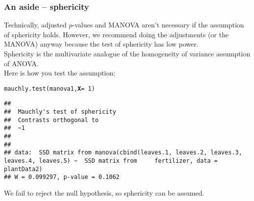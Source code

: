 \documentclass[color=usenames,dvipsnames]{beamer}\usepackage[]{graphicx}\usepackage[]{color}
\makeatletter
\newcommand{\hlnum}[1]{\textcolor[rgb]{0.69,0.494,0}{#1}}%
\newcommand{\hlopt}[1]{\textcolor[rgb]{0,0,0}{#1}}%
\newcommand{\hlstd}[1]{\textcolor[rgb]{0,0,0}{#1}}%
\newcommand{\hlkwc}[1]{\textcolor[rgb]{0,0,0}{\textbf{#1}}}%
\newcommand{\hlkwd}[1]{\textcolor[rgb]{0.004,0.004,0.506}{#1}}%
\newenvironment{kframe}{%
 \def\at@end@of@kframe{}%
 \ifinner\ifhmode%
  \def\at@end@of@kframe{\end{minipage}}%
  \begin{minipage}{\columnwidth}%
 \fi\fi%
 \def\FrameCommand##1{\hskip\@totalleftmargin \hskip-\fboxsep
 \colorbox{shadecolor}{##1}\hskip-\fboxsep
     \hskip-\linewidth \hskip-\@totalleftmargin \hskip\columnwidth}%
 \MakeFramed {\advance\hsize-\width
   \@totalleftmargin\z@ \linewidth\hsize
   \@setminipage}}%
 {\par\unskip\endMakeFramed%
 \at@end@of@kframe}
\newenvironment{knitrout}{}{} %
\makeatother
\begin{document}
\begin{frame}[fragile]
  \frametitle{An aside -- sphericity}
  \small
  {Technically, adjusted $p$-values and MANOVA aren't necessary if the
    assumption of sphericity holds. \alert{However}, we recommend
    doing the adjustments (or the MANOVA) anyway because the test of
    sphericity has low power. \\}
  \pause
  \vfill
  Sphericity is the multivariate analogue of the homogeneity of
  variance assumption of ANOVA. \\
  \pause
  \vfill
  Here is how you test the assumption: \\
  \footnotesize
\begin{knitrout}\scriptsize
{}\color{fgcolor}\begin{kframe}
\begin{alltt}
\hlkwd{mauchly.test}\hlstd{(manova1,} \hlkwc{X}\hlstd{=}\hlopt{~}\hlnum{1}\hlstd{)}
\end{alltt}
\begin{verbatim}
## 
## 	Mauchly's test of sphericity
## 	Contrasts orthogonal to
## 	~1
## 
## 
## data:  SSD matrix from manova(cbind(leaves.1, leaves.2, leaves.3, leaves.4, leaves.5) ~  SSD matrix from     fertilizer, data = plantData2)
## W = 0.099297, p-value = 0.1062
\end{verbatim}
\end{kframe}
\end{knitrout}
\pause
\vfill
\small %
{\centering We fail to reject the null hypothesis, so sphericity
  can be assumed. \\}
\end{frame}
\end{document}
